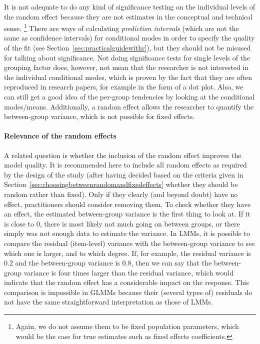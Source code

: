 It is not adequate to do any kind of significance testing on the individual levels of the random effect because they are not estimates in the conceptual and technical sense.%
\footnote{Again, we do not assume them to be fixed population parameters, which would be the case for true estimates such as fixed effects coefficients.}
There are ways of calculating \textit{prediction intervals} (which are not the same as confidence intervals) for conditional modes in order to specify the quality of the fit (see Section~\ref{sec:practicalguidewithr}), but they should not be misused for talking about significance.
Not doing significance tests for single levels of the grouping factor does, however, not mean that the researcher is not interested in the individual conditional modes, which is proven by the fact that they are often reproduced in research papers, for example in the form of a dot plot.
Also, we can still get a good idea of the per-group tendencies by looking at the conditional modes\slash means.
Additionally, a random effect allows the researcher to quantify the between-group variance, which is not possible for fixed effects.

\paragraph{Relevance of the random effects}

A related question is whether the inclusion of the random effect improves the model quality.
It is recommended here to include all random effects as required by the design of the study (after having decided based on the criteria given in Section~\ref{sec:choosingbetweenrandomandfixedeffects} whether they should be random rather than fixed).
Only if they clearly (and beyond doubt) have no effect, practitioners should consider removing them.
To check whether they have an effect, the estimated between-group variance is the first thing to look at.
If it is close to $0$, there is most likely not much going on between groups, or there simply was not enough data to estimate the variance.
In LMMs, it is possible to compare the residual (item-level) variance with the between-group variance to see which one is larger, and to which degree.
If, for example, the residual variance is 0.2 and the between-group variance is 0.8, then we can say that the between-group variance is four times larger than the residual variance, which would indicate that the random effect has a considerable impact on the response.
This comparison is impossible in GLMMs because their (several types of) residuals do not have the same straightforward interpretation as those of LMMs.

